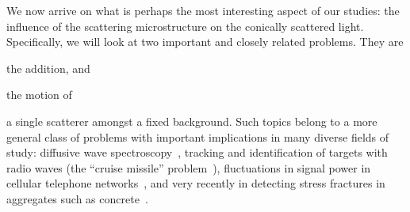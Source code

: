We now arrive on what is perhaps the most interesting aspect of our
studies: the influence of the scattering microstructure on the conically
scattered light.  Specifically, we will look at two important and closely
related problems.  They are%
\begin{inparaenum}[(a)]
\item the addition, and
\item the motion of
\end{inparaenum} %
a single scatterer amongst a fixed background.  Such topics belong to a
more general class of problems with important implications in many diverse
fields of study: diffusive wave spectroscopy~\cite{pine1988diffusing},
tracking and identification of targets with radio waves (the ``cruise
missile'' problem~\cite{atkins1991neural}), fluctuations in signal power in
cellular telephone networks~\cite{abdi2001estimation}, and very recently in
detecting stress fractures in aggregates such as
concrete~\cite{larose2010locating}.
